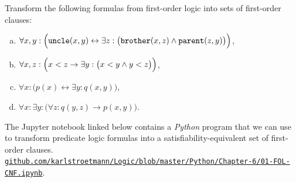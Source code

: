 \exerciseEng
Transform the following formulas from first-order logic into sets of first-order clauses:
\begin{enumerate}[(a)]
\item $\forall x, y: \Bigl(\mathtt{uncle}(x,y) \leftrightarrow
       \exists z: \bigl(\mathtt{brother}(x,z) \wedge \mathtt{parent}(z,y)\bigr)\Bigr)$,
\item $\forall x, z: \Bigl(x < z \rightarrow \exists y: \bigl(x < y \wedge y < z\bigr)\Bigr)$,
\item $\forall x: \bigl(p(x) \leftrightarrow \exists y: q(x,y) \bigr)$, 
\item $\forall x: \exists y: \bigl(\forall z:q(y,z) \rightarrow p(x,y)\bigr)$. \eox
\end{enumerate}%
\vspace*{-0.1cm}

\noindent
The Jupyter notebook linked below contains a \textsl{Python} program that we can use to transform predicate
logic formulas into a satisfiability-equivalent set of first-order clauses. 
\\[0.2cm]
\href{https://github.com/karlstroetmann/Logic/blob/master/Python/Chapter-6/01-FOL-CNF.ipynb}{\small\texttt{github.com/karlstroetmann/Logic/blob/master/Python/Chapter-6/01-FOL-CNF.ipynb}}.
\vspace*{0.2cm}

